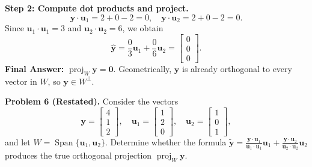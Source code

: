 \documentclass[11pt, letterpaper]{article}
\theoremstyle{definition}
\theoremstyle{remark}
\begin{document}
\textbf{Step 2: Compute dot products and project.}
\[
\mathbf{y} \cdot \mathbf{u}_1 = 2 + 0 - 2 = 0, \quad \mathbf{y} \cdot \mathbf{u}_2 = 2 + 0 - 2 = 0.
\]
Since $\mathbf{u}_1 \cdot \mathbf{u}_1 = 3$ and $\mathbf{u}_2 \cdot \mathbf{u}_2 = 6$, we obtain
\[
\hat{\mathbf{y}} = \frac{0}{3}\mathbf{u}_1 + \frac{0}{6}\mathbf{u}_2 = \begin{bmatrix} 0 \\ 0 \\ 0 \end{bmatrix}.
\]
\textbf{Final Answer:} $\operatorname{proj}_W \mathbf{y} = \mathbf{0}$. Geometrically, $\mathbf{y}$ is already orthogonal to every vector in $W$, so $\mathbf{y} \in W^\perp$.

\medskip
\textbf{Problem 6 (Restated).} Consider the vectors
\[
\mathbf{y} = \begin{bmatrix} 4 \\ 1 \\ 2 \end{bmatrix}, \quad \mathbf{u}_1 = \begin{bmatrix} 1 \\ 2 \\ 0 \end{bmatrix}, \quad \mathbf{u}_2 = \begin{bmatrix} 1 \\ 0 \\ 1 \end{bmatrix},
\]
and let $W = \operatorname{Span}\{\mathbf{u}_1, \mathbf{u}_2\}$. Determine whether the formula $\tilde{\mathbf{y}} = \frac{\mathbf{y}\cdot\mathbf{u}_1}{\mathbf{u}_1\cdot\mathbf{u}_1}\mathbf{u}_1 + \frac{\mathbf{y}\cdot\mathbf{u}_2}{\mathbf{u}_2\cdot\mathbf{u}_2}\mathbf{u}_2$ produces the true orthogonal projection $\operatorname{proj}_W \mathbf{y}$.
\end{document}
